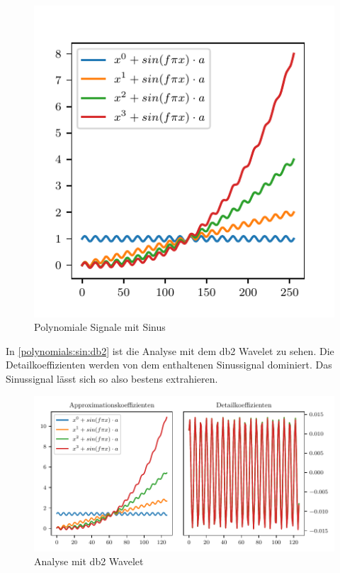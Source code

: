 \begin{refsection}
\begin{figure}
    \centering
    \includegraphics{papers/polynomials/images/polynomials_sin_signals.pdf}
    \caption{Polynomiale Signale mit Sinus\label{polynomials:sin:signals}}
\end{figure}

In \autoref{polynomials:sin:db2} ist die Analyse mit dem db2 Wavelet zu sehen.
Die Detailkoeffizienten werden von dem enthaltenen Sinussignal dominiert. Das
Sinussignal lässt sich so also bestens extrahieren.

\begin{figure}
    \centering
    \includegraphics{papers/polynomials/images/polynomials_sin_db2.pdf}
    \caption{Analyse mit db2 Wavelet\label{polynomials:sin:db2}}
\end{figure}


\end{refsection}
